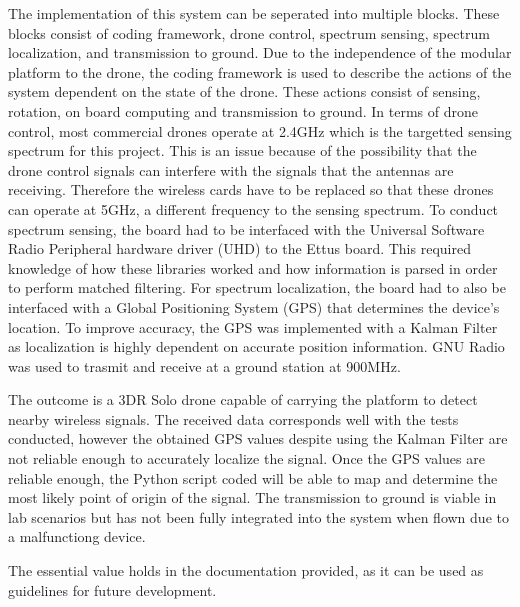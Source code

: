 The implementation of this system can be seperated into multiple blocks. These blocks consist of coding framework, drone control, spectrum sensing, spectrum localization, and transmission to ground. Due to the independence of the modular platform to the drone, the coding framework is used to describe the actions of the system dependent on the state of the drone. These actions consist of sensing, rotation, on board computing and transmission to ground. In terms of drone control, most commercial drones operate at 2.4GHz which is the targetted sensing spectrum for this project. This is an issue because of the possibility that the drone control signals can interfere with the signals that the antennas are receiving. Therefore the wireless cards have to be replaced so that these drones can operate at 5GHz, a different frequency to the sensing spectrum. To conduct spectrum sensing, the board had to be interfaced with the Universal Software Radio Peripheral hardware driver (UHD) to the Ettus board. This required knowledge of how these libraries worked and how information is parsed in order to perform matched filtering. For spectrum localization, the board had to also be interfaced with a Global Positioning System (GPS) that determines the device's location. To improve accuracy, the GPS was implemented with a Kalman Filter as localization is highly dependent on accurate position information. GNU Radio was used to trasmit and receive at a ground station at 900MHz. \par

The outcome is a 3DR Solo drone capable of carrying the platform to detect nearby wireless signals. The received data corresponds well with the tests conducted, however the obtained GPS values despite using the Kalman Filter are not reliable enough to accurately localize the signal. Once the GPS values are reliable enough, the Python script coded will be able to map and determine the most likely point of origin of the signal. The transmission to ground is viable in lab scenarios but has not been fully integrated into the system when flown due to a malfunctiong device. \par

The essential value holds in the documentation provided, as it can be used as guidelines for future development.